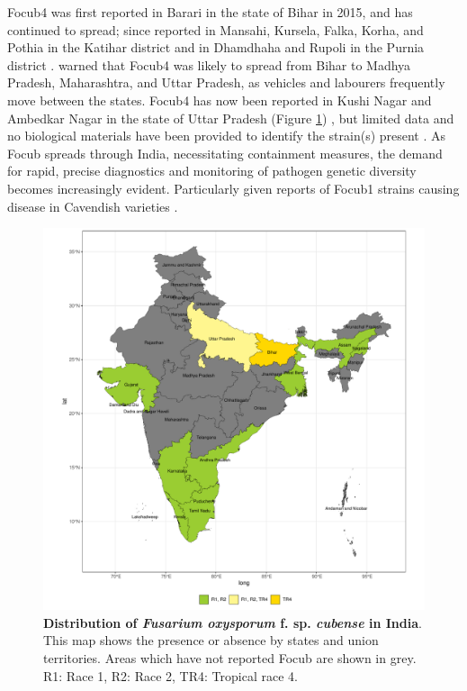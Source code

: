 \Ac{Focub4} was first reported in Barari in the state of Bihar in 2015, and has continued to spread; since reported in Mansahi, Kursela, Falka, Korha, and Pothia in the Katihar district and in Dhamdhaha and Rupoli in the Purnia district \parencite{Thangavelu2019}. \textcite{Viljoen2020} warned that \ac{Focub4} was likely to spread from Bihar to Madhya Pradesh, Maharashtra, and Uttar Pradesh, as vehicles and labourers frequently move between the states. \ac{Focub4} has now been reported in Kushi Nagar and Ambedkar Nagar in the state of Uttar Pradesh (Figure \ref{fig:FocDisIndia}) \parencite{Damodaran2019, Thangavelu2019}, but limited data and no biological materials have been provided to identify the strain(s) present \parencite{Kema2021}. As \ac{Focub} spreads through India, necessitating containment measures, the demand for rapid, precise diagnostics and monitoring of pathogen genetic diversity becomes increasingly evident. Particularly given reports of \ac{Focub1} strains causing disease in Cavendish varieties \parencite{Thangavelu2020}.

\begin{figure}[hb!]
\centering
  \includegraphics[width=13.5cm]{Figures/FocDis_India.pdf}
  \caption[Distribution of \textit{Fusarium oxysporum} f. sp. \textit{cubense} in India]{\textbf{ Distribution of \textit{Fusarium oxysporum} f. sp. \textit{cubense} in India}. This map shows the presence or absence by states and union territories. Areas which have not reported \ac{Focub} are shown in grey. R1: Race 1, R2: Race 2, TR4: Tropical race 4.}
  \label{fig:FocDisIndia}
\end{figure}

